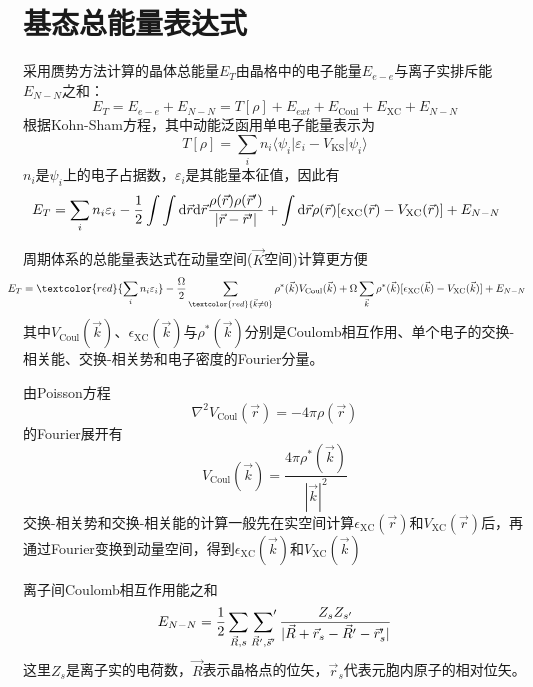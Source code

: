 \section{基态总能量表达式}
采用赝势方法计算的晶体总能量$E_T$由晶格中的电子能量$E_{e-e}$与离子实排斥能$E_{N-N}$之和：
	\begin{equation}
		E_T=E_{e-e}+E_{N-N}=T[\rho]+E_{ext}+E_{\mathrm{Coul}}+E_{\mathrm{XC}}+E_{N-N}
	\end{equation}
根据\textrm{Kohn-Sham}方程，其中动能泛函用单电子能量表示为
\begin{equation}
	T[{\rho}]=\sum_in_i\langle\psi_i|\varepsilon_i-V_{\mathrm{KS}}|\psi_i\rangle
\end{equation}
$n_i$是$\psi_i$上的电子占据数，$\varepsilon_i$是其能量本征值，因此有
\begin{equation}
	\hspace*{-12.0pt}	E_T=\sum_in_i\varepsilon_i-\dfrac12\int\int\mathrm{d}\vec r\mathrm{d}\vec r\dfrac{\rho(\vec r)\rho(\vec r^{\prime})}{|\vec r-\vec r^{\prime}|}+\int\mathrm{d}\vec r\rho(\vec r)[\epsilon_{\mathrm{XC}}(\vec r)-V_{\mathrm{XC}}(\vec r)]+E_{N-N}
\end{equation}

周期体系的总能量表达式在动量空间($\vec K$空间)计算更方便
\begin{equation}
	\hspace*{-15.0pt}	E_T=\textcolor{red}{\sum_in_i\varepsilon_i}-\dfrac{\Omega}2\sum_{\textcolor{red}{\vec k\neq 0}}\rho^{\ast}(\vec k)V_{\mathrm{Coul}}(\vec k)+\Omega\sum_{\vec k}\rho^{\ast}(\vec k)[\epsilon_{\mathrm{XC}}(\vec k)-V_{\mathrm{XC}}(\vec k)]+E_{N-N}
\end{equation}
其中$V_{\mathrm{Coul}}(\vec k)$、$\epsilon_{\mathrm{XC}}(\vec k)$与$\rho^{\ast}(\vec k)$分别是\textrm{Coulomb}相互作用、单个电子的交换-相关能、交换-相关势和电子密度的\textrm{Fourier}分量。

由\textrm{Poisson}方程
\begin{equation}
	\nabla^2V_{\mathrm{Coul}}(\vec r)=-4\pi\rho(\vec r)
\end{equation}
的\textrm{Fourier}展开有
\begin{equation}
	V_{\mathrm{Coul}}(\vec k)=\dfrac{4\pi\rho^{\ast}(\vec k)}{|\vec k|^2}
\end{equation}
交换-相关势和交换-相关能的计算一般先在实空间计算$\epsilon_{\mathrm{XC}}(\vec r)$和$V_{\mathrm{XC}}(\vec r)$后，再通过\textrm{Fourier}变换到动量空间，得到$\epsilon_{\mathrm{XC}}(\vec k)$和$V_{\mathrm{XC}}(\vec k)$

	离子间\textrm{Coulomb}相互作用能之和
	\begin{equation}
		E_{N-N}=\dfrac12\sum_{\vec R,s}\sideset{}{^{\prime}}\sum_{\vec R^{\prime},\vec s^{\prime}}\dfrac{Z_sZ_{s^{\prime}}}{|\vec R+\vec r_s-\vec R^{\prime}-\vec r_s^{\prime}|}
	\end{equation}
	这里$Z_s$是离子实的电荷数，$\vec R$表示晶格点的位矢，$\vec r_s$代表元胞内原子的相对位矢。

